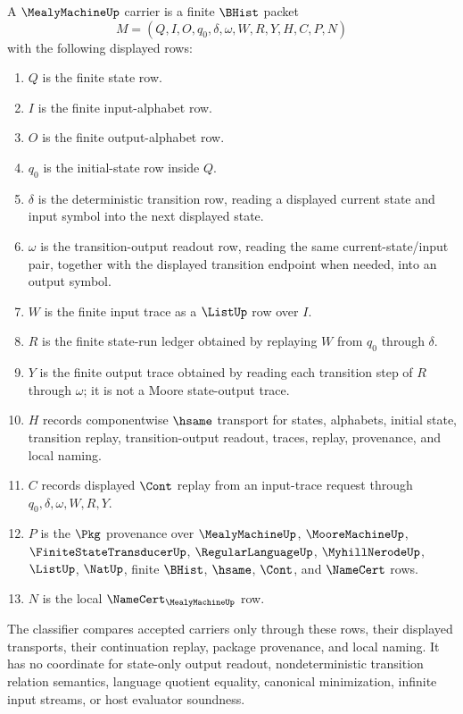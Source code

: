 \begin{definition}
\label{def:mealy-machine-carrier}
A $\MealyMachineUp$ carrier is a finite $\BHist$ packet
$$
M=(Q,I,O,q_0,\delta,\omega,W,R,Y,H,C,P,N)
$$
with the following displayed rows:
\begin{enumerate}
\item $Q$ is the finite state row.
\item $I$ is the finite input-alphabet row.
\item $O$ is the finite output-alphabet row.
\item $q_0$ is the initial-state row inside $Q$.
\item $\delta$ is the deterministic transition row, reading a displayed current state and input symbol into the next displayed state.
\item $\omega$ is the transition-output readout row, reading the same current-state/input pair, together with the displayed transition endpoint when needed, into an output symbol.
\item $W$ is the finite input trace as a $\ListUp$ row over $I$.
\item $R$ is the finite state-run ledger obtained by replaying $W$ from $q_0$ through $\delta$.
\item $Y$ is the finite output trace obtained by reading each transition step of $R$ through $\omega$; it is not a Moore state-output trace.
\item $H$ records componentwise $\hsame$ transport for states, alphabets, initial state, transition replay, transition-output readout, traces, replay, provenance, and local naming.
\item $C$ records displayed $\Cont$ replay from an input-trace request through $q_0,\delta,\omega,W,R,Y$.
\item $P$ is the $\Pkg$ provenance over $\MealyMachineUp$, $\MooreMachineUp$, $\FiniteStateTransducerUp$, $\RegularLanguageUp$, $\MyhillNerodeUp$, $\ListUp$, $\NatUp$, finite $\BHist$, $\hsame$, $\Cont$, and $\NameCert$ rows.
\item $N$ is the local $\NameCert_{\MealyMachineUp}$ row.
\end{enumerate}
The classifier compares accepted carriers only through these rows, their displayed transports, their continuation replay, package provenance, and local naming. It has no coordinate for state-only output readout, nondeterministic transition relation semantics, language quotient equality, canonical minimization, infinite input streams, or host evaluator soundness.
\end{definition}

